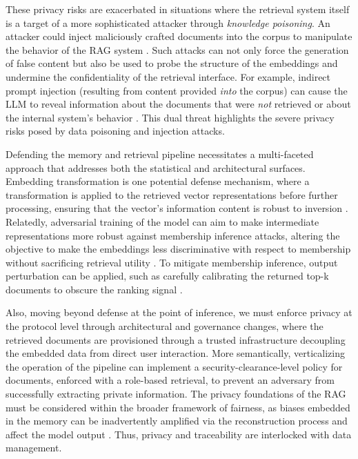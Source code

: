 \documentclass[11pt,a4paper]{article}
\begin{document}
These privacy risks are exacerbated in situations where the retrieval system itself is a target of a more sophisticated attacker through \emph{knowledge poisoning}. An attacker could inject maliciously crafted documents into the corpus to manipulate the behavior of the RAG system \cite{arxiv:2402.07867v1,arxiv:2406.05870v2}. Such attacks can not only force the generation of false content but also be used to probe the structure of the embeddings and undermine the confidentiality of the retrieval interface. For example, indirect prompt injection (resulting from content provided \emph{into} the corpus) can cause the LLM to reveal information about the documents that were \emph{not} retrieved or about the internal system's behavior \cite{arxiv:2406.05870v2}. This dual threat highlights the severe privacy risks posed by data poisoning and injection attacks.

Defending the memory and retrieval pipeline necessitates a multi-faceted approach that addresses both the statistical and architectural surfaces. Embedding transformation is one potential defense mechanism, where a transformation is applied to the retrieved vector representations before further processing, ensuring that the vector's information content is robust to inversion \cite{arxiv:2401.12599v1}. Relatedly, adversarial training of the model can aim to make intermediate representations more robust against membership inference attacks, altering the objective to make the embeddings less discriminative with respect to membership without sacrificing retrieval utility \cite{arxiv:2402.07867v1,arxiv:2406.05870v2}. To mitigate membership inference, output perturbation can be applied, such as carefully calibrating the returned top-k documents to obscure the ranking signal \cite{arxiv:2005.11401v4}.

Also, moving beyond defense at the point of inference, we must enforce privacy at the protocol level through architectural and governance changes, where the retrieved documents are provisioned through a trusted infrastructure decoupling the embedded data from direct user interaction. More semantically, verticalizing the operation of the pipeline can implement a security-clearance-level policy for documents, enforced with a role-based retrieval, to prevent an adversary from successfully extracting private information. The privacy foundations of the RAG must be considered within the broader framework of fairness, as biases embedded in the memory can be inadvertently amplified via the reconstruction process and affect the model output \cite{arxiv:2401.14887v3}. Thus, privacy and traceability are interlocked with data management.
\end{document}
